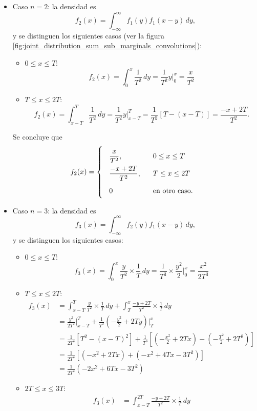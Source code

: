 \documentclass[a4paper]{report}
\begin{document}
\begin{itemize}
 \item Caso \(n=2\): la densidad es
\[
 f_2(x)=\int_{-\infty}^{\infty}f_1(y)f_1(x-y)\,dy,
\]
y se distinguen los siguientes casos (ver la figura \ref{fig:joint_distribution_sum_sub_marginals_convolutions}):
 \begin{itemize}
  \item \(0\leq x\leq T\):
  \[
   f_2(x)=\int_{0}^x\frac{1}{T^2}\,dy=\frac{1}{T^2}y\bigg|_{0}^x=\frac{x}{T^2}
  \]
  \item \(T\leq x\leq 2T\):
  \[
   f_2(x)=\int_{x-T}^T\frac{1}{T^2}\,dy=\frac{1}{T^2}y\bigg|_{x-T}^T=\frac{1}{T^2}[T-(x-T)]=\frac{-x+2T}{T^2}.
  \]
 \end{itemize}
 Se concluye que
 \[
 f_2(x)=
\def\arraystretch{2}\arraycolsep=9pt
 \left\{\begin{array}{ll}
   \displaystyle\frac{x}{T^2}, &  0\leq x\leq T\\
   \displaystyle\frac{-x+2T}{T^2}, & T\leq x\leq 2T\\ 
   0 & \textrm{en otro caso.}
 \end{array} \right.
\]
\item Caso \(n=3\): la densidad es
\[
 f_3(x)=\int_{-\infty}^{\infty}f_2(y)f_1(x-y)\,dy,
\]
 y se distinguen los siguientes casos:
 \begin{itemize}
  \item \(0\leq x\leq T\):
  \[
   f_3(x)=\int_{0}^x\frac{y}{T^2}\times\frac{1}{T}\,dy=\frac{1}{T^3}\times\frac{y^2}{2}\bigg|_{0}^x=\frac{x^2}{2T^3}
  \]
  \item \(T\leq x\leq 2T\):
  \begin{align*}
   f_3(x)&=\int_{x-T}^T\frac{y}{T^2}\times\frac{1}{T}\,dy+\int_{T}^x\frac{-y+2T}{T^2}\times\frac{1}{T}\,dy\\
   &=\frac{y^2}{2T^3}\bigg|_{x-T}^T+\frac{1}{T^3}\left(-\frac{y^2}{2}+2Ty\right)\bigg|_{T}^x\\
   &=\frac{1}{2T^3}\left[T^2-(x-T)^2\right]+\frac{1}{T^3}\left[\left(-\frac{x^2}{2}+2Tx\right)-\left(-\frac{T^2}{2}+2T^2\right)\right]\\
   &=\frac{1}{2T^3}\left[\left(-x^2+2Tx\right)+\left(-x^2+4Tx-3T^2\right)\right]\\
   &=\frac{1}{2T^3}\left(-2x^2+6Tx-3T^2\right)
  \end{align*}
  \item \(2T\leq x\leq 3T\):
  \begin{align*}
   f_3(x)&=\int_{x-T}^{2T}\frac{-y+2T}{T^2}\times\frac{1}{T}\,dy\\

\end{align*}
\end{itemize}
\end{itemize}
\end{document}
